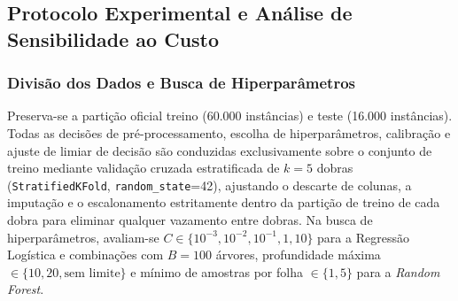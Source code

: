 \documentclass[conference]{IEEEtran}
\begin{document}
\subsection{Protocolo Experimental e Análise de Sensibilidade ao Custo}

\subsubsection{Divisão dos Dados e Busca de Hiperparâmetros}
Preserva-se a partição oficial treino (60.000 instâncias) e teste (16.000 instâncias). Todas as decisões de pré-processamento, escolha de hiperparâmetros, calibração e ajuste de limiar de decisão são conduzidas exclusivamente sobre o conjunto de treino mediante validação cruzada estratificada de $k=5$ dobras (\texttt{StratifiedKFold}, \texttt{random\_state}=42), ajustando o descarte de colunas, a imputação e o escalonamento estritamente dentro da partição de treino de cada dobra para eliminar qualquer vazamento entre dobras. Na busca de hiperparâmetros, avaliam-se $C \in \{10^{-3}, 10^{-2}, 10^{-1}, 1, 10\}$ para a Regressão Logística e combinações com $B = 100$ árvores, profundidade máxima $\in \{10, 20, \text{sem limite}\}$ e mínimo de amostras por folha $\in \{1, 5\}$ para a \textit{Random Forest}.
\end{document}
